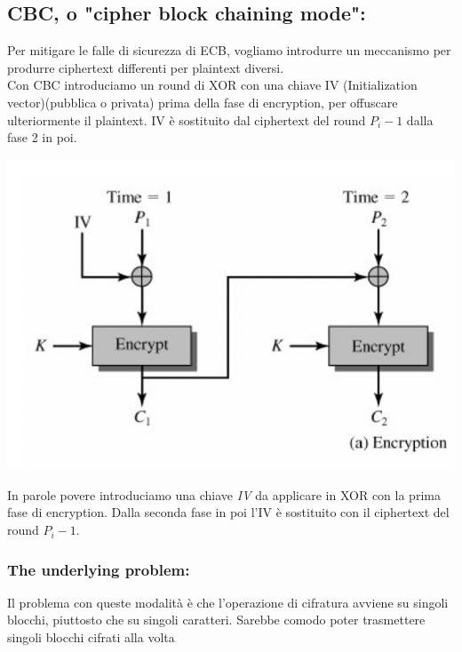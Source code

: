 \documentclass[11pt, oneside]{article}   	%
\begin{document}
\subsection*{CBC, o "cipher block chaining mode":}
Per mitigare le falle di sicurezza di ECB, vogliamo introdurre un meccanismo per produrre ciphertext differenti per plaintext diversi. \\
Con CBC introduciamo un round di XOR con una chiave IV (Initialization vector)(pubblica o privata) prima della fase di encryption, per offuscare ulteriormente il plaintext. IV è sostituito dal ciphertext del round $P_i-1$ dalla fase 2 in poi.
\begin{center}
\includegraphics[scale= 0.7]{cbc}
\end{center}
In parole povere introduciamo una chiave \emph{IV} da applicare in XOR con la prima fase di encryption. Dalla seconda fase in poi l'IV è sostituito con il ciphertext del round $P_i-1$.

\subsubsection*{The underlying problem:}
Il problema con queste modalità è che l'operazione di cifratura avviene su singoli blocchi, piuttosto che su singoli caratteri. Sarebbe comodo poter trasmettere singoli blocchi cifrati alla volta
\end{document}
